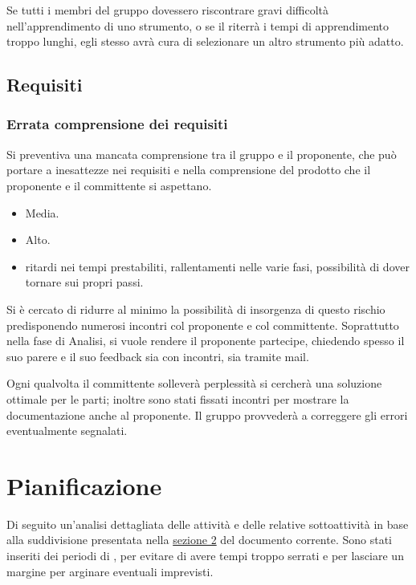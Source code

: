 \documentclass[a4paper, titlepage]{article}
\begin{document}
	Se tutti i membri del gruppo dovessero riscontrare gravi difficoltà nell'apprendimento di uno strumento, o se il  riterrà i tempi di apprendimento troppo lunghi, egli stesso avrà cura di selezionare un altro strumento più adatto.
	
	\subsection{Requisiti}
	\subsubsection{Errata comprensione dei requisiti}
	Si preventiva una mancata comprensione tra il gruppo e il proponente, che può portare a inesattezze nei requisiti e nella comprensione del prodotto che il proponente e il committente si aspettano.
	
	\begin{itemize}
		\item {} Media.
		\item {} Alto.
		\item {} ritardi nei tempi prestabiliti, rallentamenti nelle varie fasi, possibilità di dover tornare sui propri passi.
	\end{itemize}
	
	Si è cercato di ridurre al minimo la possibilità di insorgenza di questo rischio predisponendo numerosi incontri col proponente e col committente. Soprattutto nella fase di Analisi, si vuole rendere il proponente partecipe, chiedendo spesso il suo parere e il suo feedback sia con incontri, sia tramite mail.
	
	Ogni qualvolta il committente solleverà perplessità si cercherà una soluzione ottimale per le parti; inoltre sono stati fissati incontri per mostrare la documentazione anche al proponente. Il gruppo provvederà a correggere gli errori eventualmente segnalati.
	
	\newpage
	\section {Pianificazione}\label{Pianificazione}
	Di seguito un'analisi dettagliata delle attività e delle relative sottoattività in base alla suddivisione presentata nella \hyperref[Ciclo di vita]{sezione 2} del documento corrente.
	Sono stati inseriti dei periodi di , per evitare di avere tempi troppo serrati e per lasciare un margine per arginare eventuali imprevisti.
	
\end{document}
